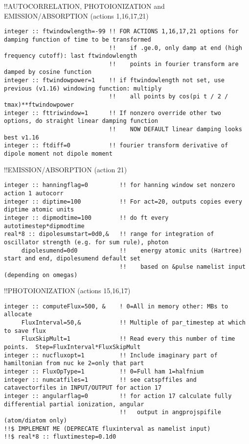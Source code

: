 !!{\large \quad AUTOCORRELATION, PHOTOIONIZATION and EMISSION/ABSORPTION (actions 1,16,17,21)}
\begin{verbatim}
integer :: ftwindowlength=-99 !! FOR ACTIONS 1,16,17,21 options for damping function of time to be transformed
                              !!    if .ge.0, only damp at end (high frequency cutoff): last ftwindowlength 
                              !!    points in fourier transform are damped by cosine function
integer :: ftwindowpower=1    !! if ftwindowlength not set, use previous (v1.16) windowing function: multiply
                              !!    all points by cos(pi t / 2 / tmax)**ftwindowpower 
integer :: fttriwindow=1      !! If nonzero override other two options, do straight linear damping function
                              !!    NOW DEFAULT linear damping looks best v1.16
integer :: ftdiff=0           !! fourier transform derivative of dipole moment not dipole moment
\end{verbatim}
!!{\large \quad EMISSION/ABSORPTION (action 21)}
\begin{verbatim}
integer :: hanningflag=0         !! for hanning window set nonzero action 1 autocorr
integer :: diptime=100           !! For act=20, outputs copies every diptime atomic units
integer :: dipmodtime=100        !! do ft every autotimestep*dipmodtime
real*8 :: dipolesumstart=0d0,&   !! range for integration of oscillator strength (e.g. for sum rule), photon
     dipolesumend=0d0            !!    energy atomic units (Hartree) start and end, dipolesumend default set
                                 !!    based on &pulse namelist input (depending on omegas)
\end{verbatim}
!!{\large \quad PHOTOIONIZATION (actions 15,16,17)}
\begin{verbatim}
integer :: computeFlux=500, &    ! 0=All in memory other: MBs to allocate
     FluxInterval=50,&           !! Multiple of par_timestep at which to save flux
     FluxSkipMult=1              !! Read every this number of time points.  Step=FluxInterval*FluxSkipMult
integer :: nucfluxopt=1          !! Include imaginary part of hamiltonian from nuc ke 2=only that part
integer :: FluxOpType=1          !! 0=Full ham 1=halfnium 
integer :: numcatfiles=1         !! see catspffiles and catavectorfiles in INPUT/OUTPUT for action 17
integer :: angularflag=0         !! for action 17 calculate fully differential partial ionization, angular
                                 !!   output in angprojspifile (atom/diatom only)
!!$ IMPLEMENT ME (DEPRECATE fluxinterval as namelist input) 
!!$ real*8 :: fluxtimestep=0.1d0
\end{verbatim}
